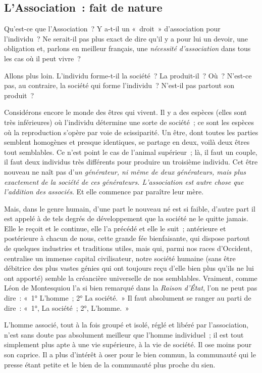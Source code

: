\documentclass[french,twoside]{book} %
\newcommand{\astermono}{\medskip\centerline{\color{rubric}\large\selectfont{\syms ✻}}\medskip\par}%
\begin{document}
\astermono

\subsection[{L’Association : fait de nature}]{L’Association : fait de nature}
\noindent Qu’est-ce que l’Association ? Y a-t-il un « droit » d’association pour l’individu ? Ne serait-il pas plus exact de dire qu’il y a pour lui un devoir, une obligation et, parlons en meilleur français, une \emph{nécessité d’association} dans tous les cas où il peut vivre ?\par
Allons plus loin. L’individu forme-t-il la société ? La produit-il ? Où ? N’est-ce pas, au contraire, la société qui forme l’individu ? N’est-il pas partout son produit ?\par
Considérons encore le monde des êtres qui vivent. Il y a des espèces (elles sont très inférieures) où l’individu détermine une sorte de société ; ce sont les espèces où la reproduction s’opère par voie de scissiparité. Un être, dont toutes les parties semblent homogènes et presque identiques, se partage en deux, voilà deux êtres tout semblables. Ce n’est point le cas de l’animal supérieur ; là, il faut un couple, il faut deux individus très différents pour produire un troisième individu. Cet être nouveau ne naît pas d’\emph{un générateur, ni même de deux générateurs, mais plus exactement de la société de ces générateurs. L’association est autre chose que l’addition des associés}. Et elle commence par paraître leur mère.\par
Mais, dans le genre humain, d’une part le nouveau né est si faible, d’autre part il est appelé à de tels degrés de développement que la société ne le quitte jamais. Elle le reçoit et le continue, elle l’a précédé et elle le suit ; antérieure et postérieure à chacun de nous, cette grande fée bienfaisante, qui dispose partout de quelques industries et traditions utiles, mais qui, parmi nos races d’Occident, centralise un immense capital civilisateur, notre société humaine (sans être débitrice des plus vastes génies qui ont toujours reçu d’elle bien plus qu’ils ne lui ont apporté) semble la créancière universelle de nos semblables. Vraiment, comme Léon de Montesquiou l’a si bien remarqué dans la \emph{Raison d’État}, l’on ne peut pas dire : « 1° L’homme ; 2° La société. » Il faut absolument se ranger au parti de dire : « 1°, La société ; 2°, L’homme. »\par
L’homme associé, tout à la fois groupé et isolé, réglé et libéré par l’association, n’est sans doute pas absolument meilleur que l’homme individuel ; il est tout simplement plus apte à une vie supérieure, à la vie de société. Il ose moins pour son caprice. Il a plus d’intérêt à oser pour le bien commun, la communauté qui le presse étant petite et le bien de la communauté plus proche du sien.\par
\end{document}
